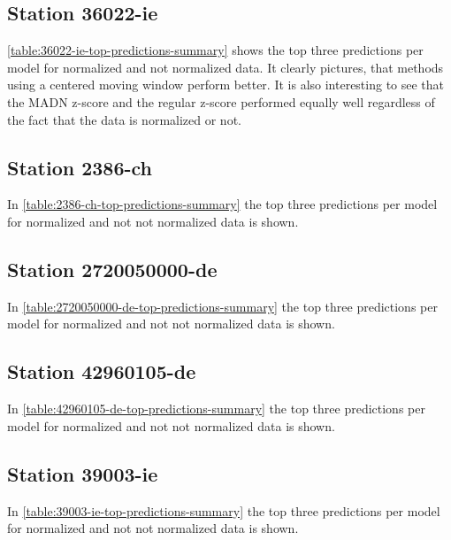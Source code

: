 \subsection{Station 36022-ie}
\autoref{table:36022-ie-top-predictions-summary} shows the top three predictions per model for normalized and not normalized data. It clearly pictures, that methods using a centered moving window perform better. It is also interesting to see that the \ac{MADN} z-score and the regular z-score performed equally well regardless of the fact that the data is normalized or not. 


\subsection{Station 2386-ch}
In \autoref{table:2386-ch-top-predictions-summary} the top three predictions per model for normalized and not not normalized data is shown.


\subsection{Station 2720050000-de}
In \autoref{table:2720050000-de-top-predictions-summary} the top three predictions per model for normalized and not not normalized data is shown.


\subsection{Station 42960105-de}
In \autoref{table:42960105-de-top-predictions-summary} the top three predictions per model for normalized and not not normalized data is shown.


\subsection{Station 39003-ie}
In \autoref{table:39003-ie-top-predictions-summary} the top three predictions per model for normalized and not not normalized data is shown.



